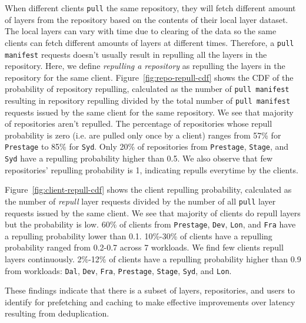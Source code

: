 When different clients \texttt{pull} the same repository, 
they will fetch different amount of layers from the repository based on the contents of their local layer dataset. The local layers can vary with time due to clearing of the data so the same clients can fetch different amounts of layers at different times.
Therefore, a \texttt{pull manifest} requests doesn't usually result in repulling all the layers in the repository. 
Here, we define \emph{repulling a repository} as repulling the layers in the repository for the same client.
Figure~\ref{fig:repo-repull-cdf} shows the CDF of the probability of repository repulling, calculated 
as the number of \texttt{pull manifest} resulting in repository repulling divided by 
the total number of \texttt{pull manifest} requests issued by the same client for the same repository.
We see that majority of repositories aren't repulled.
The percentage of repositories whose repull probability is zero (i.e. are pulled only once by a client) ranges from 57\% for \texttt{Prestage} to 85\% for \texttt{Syd}.
Only 20\% of repositories from  \texttt{Prestage}, \texttt{Stage}, and 
\texttt{Syd} have a repulling probability higher than 0.5.
We also observe that few repositories' repulling probability is 1, indicating repulls everytime by the clients.
 
Figure~\ref{fig:client-repull-cdf} shows the client repulling probability, calculated as the number of \emph{repull} layer requests divided by
the number of all \texttt{pull} layer requests issued by the same client.
We see that majority of clients do repull layers but the probability is low.
60\% of clients from \texttt{Prestage}, \texttt{Dev}, \texttt{Lon}, and \texttt{Fra} have a repulling probability lower than 0.1.
10\%-30\% of clients have a repulling probability ranged from 0.2-0.7 across 7 workloads.
We find few clients repull layers continuously.
2\%-12\% of clients have a repulling probability higher than 0.9 from workloads:
\texttt{Dal}, \texttt{Dev}, \texttt{Fra}, \texttt{Prestage},
\texttt{Stage}, \texttt{Syd}, and \texttt{Lon}.

These findings indicate that there is a subset of layers, repositories, and users to identify for prefetching and caching to make effective improvements over latency resulting from deduplication.

